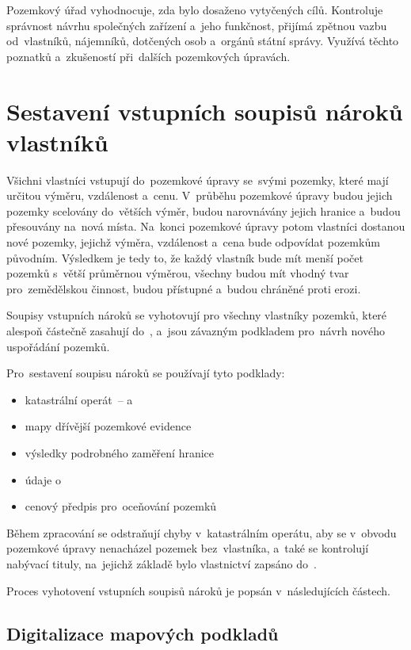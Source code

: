 Pozemkový úřad vyhodnocuje, zda bylo dosaženo vytyčených
cílů. Kontroluje správ\-nost návrhu společných zařízení a~jeho
funkčnost, přijímá zpětnou vazbu od~vlastníků, nájemníků, dotčených
osob a~orgánů státní správy. Využívá těchto poznatků a~zkušeností
při~dalších pozemkových úpravách.

\section{Sestavení vstupních soupisů nároků vlastníků}
\label{naroky}

Všichni vlastníci vstupují do~pozemkové úpravy se~svými pozemky, které
mají určitou výměru, vzdálenost a~cenu. V~průběhu pozemkové úpravy
budou jejich pozemky scelovány do~větších výměr, budou narovnávány
jejich hranice a~budou přesouvány na~nová místa. Na~konci pozemkové
úpravy potom vlastníci dostanou nové pozemky, jejichž výměra,
vzdálenost a~cena bude odpovídat pozemkům původním. Výsledkem je tedy
to, že každý vlastník bude mít menší počet pozemků s~větší průměrnou
výměrou, všechny budou mít vhodný tvar pro~zemědělskou činnost, budou
přístupné a~budou chráněné proti erozi.

Soupisy vstupních nároků se vyhotovují pro všechny vlastníky pozemků,
které alespoň částečně zasahují do~, a~jsou závazným
podkladem pro~návrh nového uspořádání pozemků.

Pro~sestavení soupisu nároků se používají tyto podklady:
\vspace{-\topsep}
	\begin{itemize}[leftmargin=1.5cm, noitemsep]
		\item katastrální operát~–  a~
		\item mapy dřívější pozemkové evidence
		\item výsledky podrobného zaměření hranice 
		\item údaje o~
		\item cenový předpis pro~oceňování pozemků
	\end{itemize}

Během zpracování  se odstraňují chyby v~katastrálním operátu,
aby se v~obvodu pozemkové úpravy nenacházel pozemek bez~vlastníka,
a~také se kontrolují nabývací tituly, na~jejichž základě bylo
vlastnictví zapsáno do~.

Proces vyhotovení vstupních soupisů nároků je popsán v~následujících
částech.

\subsection{Digitalizace mapových podkladů}
\label{digitalizace}

